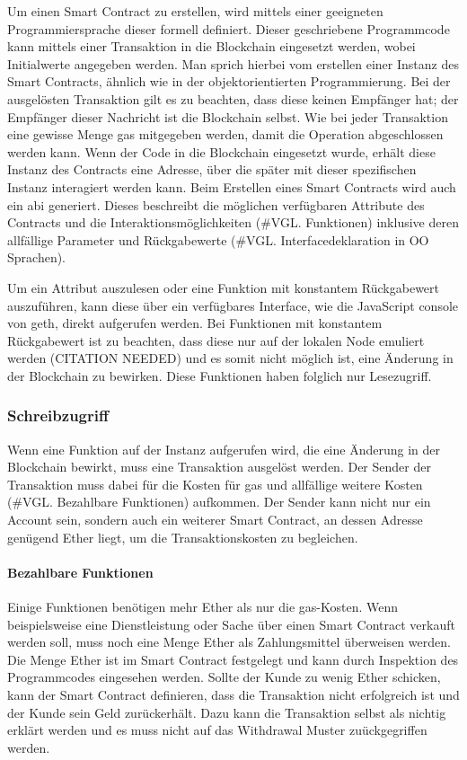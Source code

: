 Um einen Smart Contract zu erstellen, wird mittels einer geeigneten Programmiersprache dieser formell definiert. Dieser geschriebene Programmcode kann mittels einer Transaktion in die Blockchain eingesetzt werden, wobei Initialwerte angegeben werden. Man sprich hierbei vom erstellen einer Instanz des Smart Contracts, ähnlich wie in der objektorientierten Programmierung. Bei der ausgelösten Transaktion gilt es zu beachten, dass diese keinen Empfänger hat; der Empfänger dieser Nachricht ist die Blockchain selbst. Wie bei jeder Transaktion eine gewisse Menge gas mitgegeben werden, damit die Operation abgeschlossen werden kann. Wenn der Code in die Blockchain eingesetzt wurde, erhält diese Instanz des Contracts eine Adresse, über die später mit dieser spezifischen Instanz interagiert werden kann.
Beim Erstellen eines Smart Contracts wird auch ein abi generiert. Dieses beschreibt die möglichen verfügbaren Attribute des Contracts und die Interaktionsmöglichkeiten (\#VGL. Funktionen) inklusive deren allfällige Parameter und Rückgabewerte (\#VGL. Interfacedeklaration in OO Sprachen).

Um ein Attribut auszulesen oder eine Funktion mit konstantem Rückgabewert auszuführen, kann diese über ein verfügbares Interface, wie die JavaScript console von geth, direkt aufgerufen werden. Bei Funktionen mit konstantem Rückgabewert ist zu beachten, dass diese nur auf der lokalen Node emuliert werden (CITATION NEEDED) und es somit nicht möglich ist, eine Änderung in der Blockchain zu bewirken. Diese Funktionen haben folglich nur Lesezugriff.

\subsubsection{Schreibzugriff}
Wenn eine Funktion auf der Instanz aufgerufen wird, die eine Änderung in der Blockchain bewirkt, muss eine Transaktion ausgelöst werden. Der Sender der Transaktion muss dabei für die Kosten für gas und allfällige weitere Kosten (\#VGL. Bezahlbare Funktionen) aufkommen. Der Sender kann nicht nur ein Account sein, sondern auch ein weiterer Smart Contract, an dessen Adresse genügend Ether liegt, um die Transaktionskosten zu begleichen.

\paragraph{Bezahlbare Funktionen}
Einige Funktionen benötigen mehr Ether als nur die gas-Kosten. Wenn beispielsweise eine Dienstleistung oder Sache über einen Smart Contract verkauft werden soll, muss noch eine Menge Ether als Zahlungsmittel überweisen werden. Die Menge Ether ist im Smart Contract festgelegt und kann durch Inspektion des Programmcodes eingesehen werden. Sollte der Kunde zu wenig Ether schicken, kann der Smart Contract definieren, dass die Transaktion nicht erfolgreich ist und der Kunde sein Geld zurückerhält. Dazu kann die Transaktion selbst als nichtig erklärt werden und es muss nicht auf das Withdrawal Muster zuückgegriffen werden.

